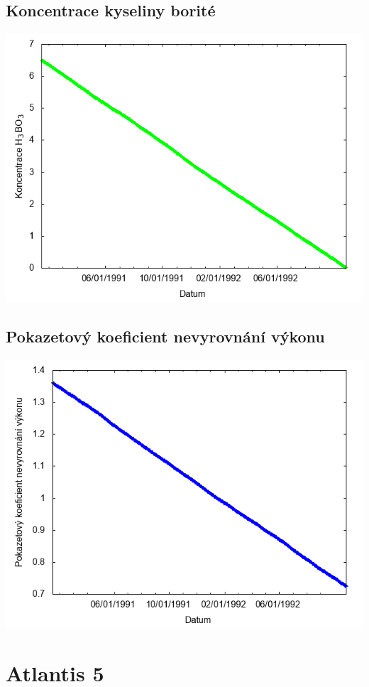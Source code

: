 \documentclass[a4paper,twoside,11pt]{article}
\begin{document}
\subsection*{Koncentrace kyseliny borité}
\begin{center}
\includegraphics[width=.8\textwidth]{graphs/Atlantis_04_bc.png}
\end{center}

\subsection*{Pokazetový koeficient nevyrovnání výkonu}
\begin{center}
\includegraphics[width=.8\textwidth]{graphs/Atlantis_04_fha.png}
\end{center}

\newpage
\section*{Atlantis 5}
\end{document}
